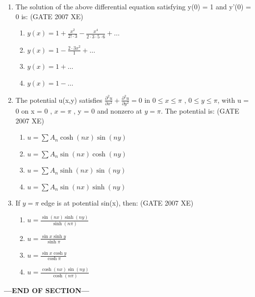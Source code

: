 \documentclass[journal,cmex10]{IEEEtran}
\theoremstyle{remark}
\numberwithin{equation}{enumi}
\numberwithin{figure}{enumi}
\begin{document}
\begin{enumerate}
    \item The solution of the above differential equation satisfying y(0) = 1 and y'(0) = 0 is:
    \hfill{(GATE 2007 XE)}
    \begin{multicols}{2}
    \begin{enumerate}
        \item $y(x) = 1 + \frac{x^2}{2! \cdot 3} - \frac{x^4}{2 \cdot 3 \cdot 5 \cdot 6} + \dots$
        \item  $y(x) = 1 - \frac{2 \cdot 3 x^2}{1} + \dots$
        \item $y(x) = 1 + \dots$
        \item $y(x) = 1 - \dots$
    \end{enumerate}
\end{multicols}

    \item The potential u(x,y) satisfies $\frac{\partial^2 u}{\partial x^2} + \frac{\partial^2 u}{\partial y^2} = 0$ in $0 \le x \le \pi$ , $0 \le y \le \pi$, with u = 0 on x = 0 ,  $x = \pi$ , y = 0 and nonzero at $y = \pi$. The potential is:
    \hfill{(GATE 2007 XE)}
    \begin{multicols}{2}
    \begin{enumerate}
        \item $u = \sum A_n \cosh(nx) \sin(ny)$
        \item $u = \sum A_n \sin(nx) \cosh(ny)$
        \item $u = \sum A_n \sinh(nx) \sin(ny)$
        \item $u = \sum A_n \sin(nx) \sinh(ny)$
    \end{enumerate}
\end{multicols}

    \item If  $y = \pi$ edge is at potential sin(x), then:
    \hfill{(GATE 2007 XE)}
    \begin{multicols}{2}
    \begin{enumerate}
    
        \item $u = \frac{\sin(nx) \sinh(ny)} {\sinh(n\pi)}$
        \item $u = \frac{\sin x \sinh y} {\sinh \pi}$
        \item $u = \frac{\sin x \cosh y} {\cosh \pi}$
        \item  $u = \frac{\cosh(nx) \sin(ny)} {\cosh(n\pi)}$
    \end{enumerate}
\end{multicols}


\end{enumerate}
    \vspace{3\baselineskip}
    \begin{center}
    \textbf{\Large ---END OF SECTION---}
    \end{center}
\end{document}
